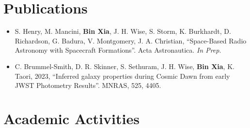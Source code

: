 \documentclass[a4paper,12pt]{article}
\begin{document}
\section{Publications}

\begin{itemize}[leftmargin=0cm]
\setlength{\itemsep}{-5pt}
\item[] S. Henry, M. Mancini, \textbf{Bin Xia}, J. H. Wise, S. Storm, K. Burkhardt, D. Richardson, G. Badura, V. Montgomery, J. A. Christian, ``Space-Based Radio Astronomy with Spacecraft Formations''. Acta Astronautica. \textit{In Prep}.
\item[] C. Brummel-Smith, D. R. Skinner, S. Sethuram, J. H. Wise, \textbf{Bin Xia}, K. Taori, 2023, “Inferred galaxy
properties during Cosmic Dawn from early JWST Photometry Results”. MNRAS, 525, 4405.
\end{itemize}

\section{Academic Activities}
\end{document}
